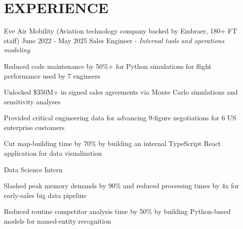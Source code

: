 \section{EXPERIENCE}

\begin{experience}
                   {Eve Air Mobility \textnormal{(Aviation technology company backed by Embraer, 180+ FT staff)}}
                   {June 2022 - May 2025}
                   {Sales Engineer - \textnormal{\textit{Internal tools and operations modeling}}}
    \item Reduced code maintenance by 50\%+ for Python simulations for flight performance used by 7 engineers
    \item Unlocked \$350M+ in signed sales agreements via Monte Carlo simulations and sensitivity analyses
    \item Provided critical engineering data for advancing 9-figure negotiations for 6 US enterprise customers
    \item Cut map-building time by 70\% by building an internal TypeScript React application for data visualization 
\end{experience}
\vspace{0.1 cm}
\begin{same_org_experience}
                    {Data Science Intern}
    \item Slashed peak memory demands by 90\% and reduced processing times by 4x for early-sales big data pipeline
    \item Reduced routine competitor analysis time by 50\% by building Python-based models for named-entity recognition 
\end{same_org_experience}